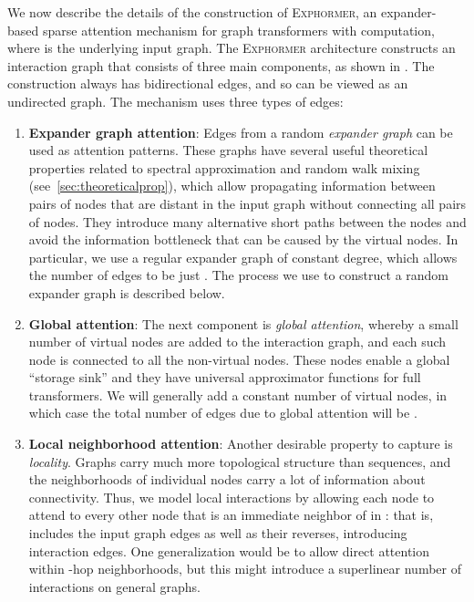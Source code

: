 \documentclass{article}
\theoremstyle{plain}
\theoremstyle{definition}
\theoremstyle{remark}
\begin{document}
We now describe the details of the construction of \textsc{Exphormer}, an expander-based sparse attention mechanism for graph transformers with  computation, where  is the underlying input graph. The \textsc{Exphormer} architecture constructs an interaction graph  that consists of three main components, as shown in . The construction always has bidirectional edges, and so  can be viewed as an undirected graph.
The mechanism uses three types of edges:
\begin{enumerate}
    \item {\bf Expander graph attention}: Edges from a random \emph{expander graph} can be used as attention patterns. These graphs have several useful theoretical properties related to spectral approximation and random walk mixing (see~\cref{sec:theoreticalprop}), which allow propagating information between pairs of nodes that are distant in the input graph  without connecting all pairs of nodes. They introduce many alternative short paths between the nodes and avoid the information bottleneck that can be caused by the virtual nodes. In particular, we use a regular expander graph of constant degree, which allows the number of edges to be just . The process we use to construct a random expander graph is described below.
    
    \item {\bf Global attention}: The next component is \emph{global attention}, whereby a small number of virtual nodes are added to the interaction graph, and each such node is connected to all the non-virtual nodes. These nodes enable a global ``storage sink'' and they have universal approximator functions for full transformers. We will generally add a constant number of virtual nodes, in which case the total number of edges due to global attention will be .
    \item {\bf Local neighborhood attention}: Another desirable property to capture is \emph{locality}. Graphs carry much more topological structure than sequences, and the neighborhoods of individual nodes carry a lot of information about connectivity.
    Thus, we model local interactions by allowing each node  to attend to every other node that is an immediate neighbor of  in :
    that is,  includes the input graph edges  as well as their reverses, introducing  interaction edges.
    One generalization would be to allow direct attention within -hop neighborhoods, but this might introduce a superlinear number of interactions on general graphs.

    
\end{enumerate}
\end{document}
